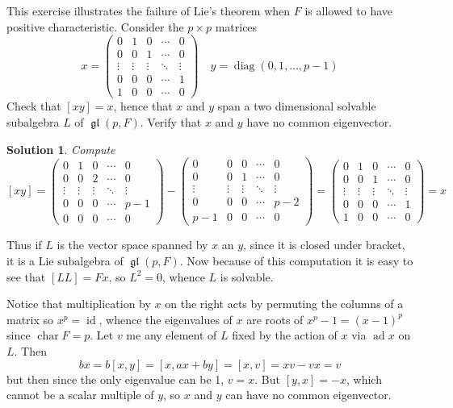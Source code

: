 \documentclass[12pt]{article}
\newenvironment{hwprob}[1]
{\renewcommand{\theprob}{#1}%
 \addtocounter{thm}{-1}%
 \begin{prob}}
{\end{prob}}
\theoremstyle{nonumberbreak}
\newtheorem{sol}{Solution}
\theoremstyle{changebreak}
\theoremstyle{nonumberbreak}
\theoremstyle{change}
\DeclareMathOperator{\ch}{char}
\DeclareMathOperator{\id}{id}
\DeclareMathOperator{\gl}{\mathfrak{gl}}
\DeclareMathOperator{\ad}{ad}
\DeclareMathOperator{\diag}{diag}
\begin{document}
\begin{hwprob}{4.3}
	This exercise illustrates the failure of Lie's theorem when $F$ is allowed to have positive characteristic.
	Consider the $p\times p$ matrices
	\[x=\begin{pmatrix} 
		0 & 1 & 0 & \cdots & 0\\
		0 & 0 & 1 & \cdots & 0\\
		\vdots & \vdots & \vdots & \ddots & \vdots\\
		0 & 0 & 0 & \cdots & 1\\
		1 & 0 & 0 & \cdots & 0
	\end{pmatrix}\quad y=\diag(0,1,\dots, p-1)\]
	Check that $[xy]=x$, hence that $x$ and $y$ span a two dimensional solvable subalgebra $L$ of $\gl(p,F)$. Verify that $x$ and $y$ have no common eigenvector.
\end{hwprob}
\begin{sol}
	Compute
	\[[xy]=\begin{pmatrix} 
		0 & 1 & 0 & \cdots & 0\\
		0 & 0 & 2 & \cdots & 0\\
		\vdots & \vdots & \vdots & \ddots & \vdots\\
		0 & 0 & 0 & \cdots & p-1\\
		0 & 0 & 0 & \cdots & 0
	\end{pmatrix}-\begin{pmatrix} 
		0 & 0 & 0 & \cdots & 0\\
		0 & 0 & 1 & \cdots & 0\\
		\vdots & \vdots & \vdots & \ddots & \vdots\\
		0 & 0 & 0 & \cdots & p-2\\
		p-1 & 0 & 0 & \cdots & 0
	\end{pmatrix}=\begin{pmatrix} 
		0 & 1 & 0 & \cdots & 0\\
		0 & 0 & 1 & \cdots & 0\\
		\vdots & \vdots & \vdots & \ddots & \vdots\\
		0 & 0 & 0 & \cdots & 1\\
		1 & 0 & 0 & \cdots & 0
	\end{pmatrix}=x\]
\end{sol}
Thus if $L$ is the vector space spanned by $x$ an $y$, since it is closed under bracket, 
it is a Lie subalgebra of $\gl(p,F)$. Now because of this computation it is easy to see that
$[LL]=Fx$, so $L^2=0$, whence $L$ is solvable.

Notice that multiplication by $x$ on the right acts by permuting the columns of a matrix so $x^p=\id$,
whence the eigenvalues of $x$ are roots of $x^p-1=(x-1)^p$ since $\ch F=p$. Let $v$ me any element of $L$ 
fixed by the action of $x$ via $\ad x$ on $L$. Then
\[bx=b[x,y]=[x,ax+by]=[x,v]=xv-vx=v\]
but then since the only eigenvalue can be 1, $v=x$. But $[y,x]=-x$, which cannot be a scalar multiple of $y$,
so $x$ and $y$ can have no common eigenvector.
\newpage
\end{document}
